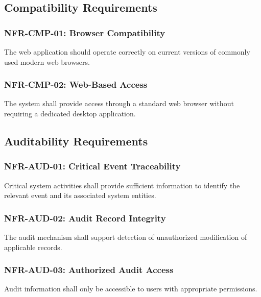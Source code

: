 \subsection{Compatibility Requirements}

\subsubsection{NFR-CMP-01: Browser Compatibility}

The web application should operate correctly on current versions of
commonly used modern web browsers.

\subsubsection{NFR-CMP-02: Web-Based Access}

The system shall provide access through a standard web browser without
requiring a dedicated desktop application.



\subsection{Auditability Requirements}

\subsubsection{NFR-AUD-01: Critical Event Traceability}

Critical system activities shall provide sufficient information to
identify the relevant event and its associated system entities.

\subsubsection{NFR-AUD-02: Audit Record Integrity}

The audit mechanism shall support detection of unauthorized modification
of applicable records.

\subsubsection{NFR-AUD-03: Authorized Audit Access}

Audit information shall only be accessible to users with appropriate
permissions.